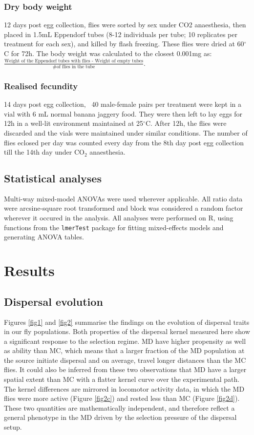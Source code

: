 \documentclass[12pt,onecolumn,twoside]{article}
\begin{document}
	\subsubsection{Dry body weight}
	12 days post egg collection, flies were sorted by sex under CO2 anaesthesia, then placed in 1.5mL Eppendorf tubes (8-12 individuals per tube; 10 replicates per treatment for each sex), and killed by flash freezing. These flies were dried at 60$^{\circ}$C for 72h. The body weight was calculated to the closest 0.001mg as: $\frac{\text{Weight of the Eppendorf tubes with flies - Weight of empty tubes}}{\text{\# of flies in the tube}}$.
	\subsubsection{Realised fecundity}
	14 days post egg collection, ~40 male-female pairs per treatment were kept in a vial with 6 mL normal banana jaggery food. They were then left to lay eggs for 12h in a well-lit environment maintained at 25$^{\circ}$C. After 12h, the flies were discarded and the vials were maintained under similar conditions. The number of flies eclosed per day was counted every day from the 8th day post egg collection till the 14th day under $\text{CO}_{2}$ anaesthesia.

	\subsection{Statistical analyses}
	Multi-way mixed-model ANOVAs were used wherever applicable. All ratio data were arcsine-square root transformed and block was considered a random factor wherever it occured in the analysis. All analyses were performed on R, using functions from the \texttt{lmerTest} package for fitting mixed-effects models and generating ANOVA tables.

	\section{Results}
	\subsection{Dispersal evolution}
	Figures \ref{fig1} and \ref{fig2} summarise the findings on the evolution of dispersal traits in our fly populations. Both properties of the dispersal kernel measured here show a significant response to the selection regime. MD have higher propensity as well as ability than MC, which means that a larger fraction of the MD population at the source initiate dispersal and on average, travel longer distances than the MC flies. It could also be inferred from these two observations that MD have a larger spatial extent than MC with a flatter kernel curve over the experimental path. The kernel differences are mirrored in locomotor activity data, in which the MD flies were more active (Figure \ref{fig2c}) and rested less than MC (Figure \ref{fig2d}). These two quantities are mathematically independent, and therefore reflect a general phenotype in the MD driven by the selection pressure of the dispersal setup.
\end{document}

